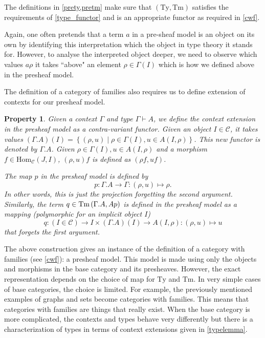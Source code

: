 \documentclass[11pt,a4paper,twoside,xetex,draft]{book}
\newtheorem{property}[theorem]{Property}
\begin{document}
The definitions in \cref{prety,pretm} make sure that $(\text{Ty},\text{Tm})$  satisfies the requirements of \cref{type_functor} and is an appropriate functor as required in \cref{cwf}.


Again, one often pretends that a term $a$ in a pre-sheaf model is an object on its own by identifying this interpretation which the object in type theory it stands for. However, to analyse the interpreted object deeper,  we need to observe which values $a\rho$ it takes ``above" an element $\rho \in \Gamma (I)$ which is how we defined above in the presheaf model.

The definition of a category of families also requires us to define extension of contexts for our presheaf model. 

\begin{property}\label{preext}
Given a context $\Gamma$ and type $\Gamma \vdash A$, we define the context extension in the presheaf model as a contra-variant functor. Given an object $I \in \mathcal{C}$, it takes values $(\Gamma . A)(I) = \left\{ (\rho , u) \mid \rho \in \Gamma (I) , u \in A (I, \rho ) \right\}$. This new functor is denoted by $\Gamma . A$. Given $\rho \in \Gamma (I), u \in A(I,\rho )$ and a morphism $f \in \text{Hom}_{\mathcal{C}}(J,I)$, $(\rho, u)f$ is defined as $(\rho f, uf)$. 


The map $p$ in the presheaf model is defined by $$p: \Gamma . A \rightarrow \Gamma : (\rho , u ) \mapsto \rho.$$ In other words, this is just the projection forgetting the second argument. Similarly, the term $q \in \text{Tm}\left(\Gamma . A,Ap\right) $ is defined in the presheaf model  as a mapping (polymorphic for an implicit object $I$) $$q: (I \in \mathcal{C}) \rightarrow I \times (\Gamma . A)(I) \rightarrow A(I,\rho): (\rho, u) \mapsto u$$ that forgets the first argument.
\end{property}

The above construction gives an instance of the definition of a category with families (see \cref{cwf}): a presheaf model. This model is made using only the objects and morphisms in the base category and its presheaves. However, the exact representation depends on the choice of map for $\text{Ty}$ and $\text{Tm}$. In very simple cases of base categories, the choice is limited. For example, the previously mentioned examples of graphs and sets become categories with families. This means that categories with families are things that really exist. When the base category is more complicated, the contexts and types behave very differently but there is a characterization of types in terms of context extensions given in \cref{typelemma}.
\end{document}
